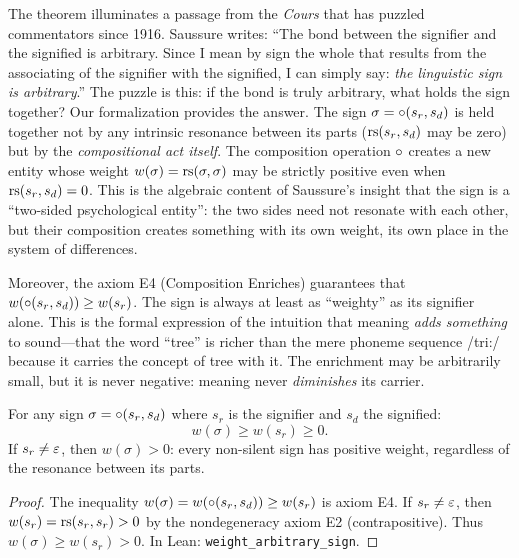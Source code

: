 \begin{interpretation}
\label{interp:saussure-cours}
The theorem illuminates a passage from the \textit{Cours} that has puzzled commentators since 1916. Saussure writes: ``The bond between the signifier and the signified is arbitrary. Since I mean by sign the whole that results from the associating of the signifier with the signified, I can simply say: \emph{the linguistic sign is arbitrary}.'' The puzzle is this: if the bond is truly arbitrary, what holds the sign together? Our formalization provides the answer. The sign $\sigma = \circ(s_r, s_d)$ is held together not by any intrinsic resonance between its parts ($\mathrm{rs}(s_r, s_d)$ may be zero) but by the \emph{compositional act itself}. The composition operation $\circ$ creates a new entity whose weight $w(\sigma) = \mathrm{rs}(\sigma, \sigma)$ may be strictly positive even when $\mathrm{rs}(s_r, s_d) = 0$. This is the algebraic content of Saussure's insight that the sign is a ``two-sided psychological entity'': the two sides need not resonate with each other, but their composition creates something with its own weight, its own place in the system of differences.

Moreover, the axiom E4 (Composition Enriches) guarantees that $w(\circ(s_r, s_d)) \geq w(s_r)$. The sign is always at least as ``weighty'' as its signifier alone. This is the formal expression of the intuition that meaning \emph{adds something} to sound---that the word ``tree'' is richer than the mere phoneme sequence /tri:/ because it carries the concept of tree with it. The enrichment may be arbitrarily small, but it is never negative: meaning never \emph{diminishes} its carrier.
\end{interpretation}

\begin{theorem}
\label{thm:weight-arbitrary-sign}
For any sign $\sigma = \circ(s_r, s_d)$ where $s_r$ is the signifier and $s_d$ the signified:
\[
  w(\sigma) \geq w(s_r) \geq 0.
\]
If $s_r \neq \varepsilon$, then $w(\sigma) > 0$: every non-silent sign has positive weight, regardless of the resonance between its parts.
\end{theorem}

\begin{proof}
The inequality $w(\sigma) = w(\circ(s_r, s_d)) \geq w(s_r)$ is axiom E4. If $s_r \neq \varepsilon$, then $w(s_r) = \mathrm{rs}(s_r, s_r) > 0$ by the nondegeneracy axiom E2 (contrapositive). Thus $w(\sigma) \geq w(s_r) > 0$. In Lean: \texttt{weight\_arbitrary\_sign}.
\end{proof}

